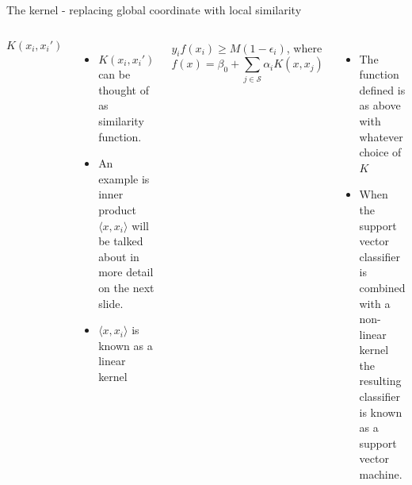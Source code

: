 \documentclass[aspectratio=169,usenames,dvipsnames]{beamer}
\newcommand{\InstructorList}[1]{
\begin{itemize}
	\color{orange}
	#1
\end{itemize}
}
\begin{document}


\begin{frame}[t]{The kernel - replacing global coordinate with local similarity}

\begin{columns}
\centering
\begin{equation*}
	K(x_i,x_i')
\end{equation*}
\InstructorList{
	\item $K(x_i,x_i')$ can be thought of as similarity function.
  	\item An example is inner product $\langle x, x_i \rangle$ will be talked about in more detail on the next slide.
	\item $\langle x, x_i \rangle$ is known as a linear kernel
}

\centering
$y_i f(x_i)\geq M(1-\epsilon_i)$, where
\begin{equation*}
	f(x) = \beta_0 + \sum_{j \in \mathcal{S}}\alpha_i K(x,x_j)
\end{equation*}

\InstructorList{
  \item The function defined is as above with whatever choice of $K$
  
	\item When the support vector classifier is combined with a non-linear kernel the resulting classifier is 	known as a support vector machine.
}

\end{columns}

\end{frame}


\end{document}
